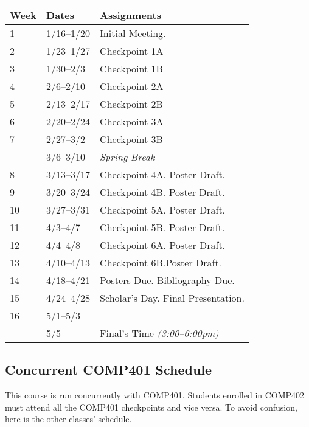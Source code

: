 \documentclass[10pt]{article}
\begin{document}
\begin{center}
\begin{tabular}{lll}
Week & Dates & Assignments \\ \toprule
1 & 1/16--1/20 &  Initial Meeting.  \\
2 & 1/23--1/27 & Checkpoint 1A \\
3 & 1/30--2/3 & Checkpoint 1B \\
4 & 2/6--2/10 & Checkpoint 2A \\
5 & 2/13--2/17 & Checkpoint 2B \\
6 & 2/20--2/24 & Checkpoint 3A  \\
7 & 2/27--3/2 & Checkpoint 3B \\
 & 3/6--3/10 & \textit{Spring Break} \\
8 & 3/13--3/17  & Checkpoint 4A. Poster Draft. \\
9 & 3/20--3/24 & Checkpoint 4B. Poster Draft.   \\
10 & 3/27--3/31 & Checkpoint 5A. Poster Draft. \\
11 & 4/3--4/7 &  Checkpoint 5B. Poster Draft. \\
12 & 4/4--4/8 &  Checkpoint 6A. Poster Draft.   \\
13 & 4/10--4/13 & Checkpoint 6B.Poster Draft. \\
14 & 4/18--4/21 & Posters Due. Bibliography Due.  \\
15 & 4/24--4/28 & Scholar's Day. Final Presentation. \\
16 & 5/1--5/3 &   \\ \midrule
  & 5/5 & Final's Time \textit{(3:00--6:00pm)}  \\
\end{tabular}
\end{center}

\subsection{Concurrent COMP401 Schedule}

This course is run concurrently with COMP401. Students enrolled in COMP402 must attend all the COMP401 checkpoints and vice versa. To avoid confusion, here is the other classes' schedule.
\end{document}
